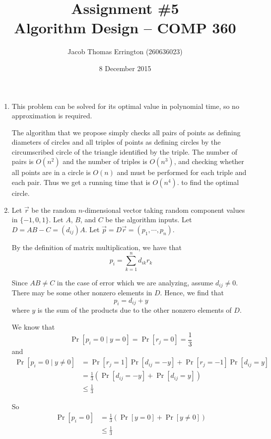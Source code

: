 \documentclass[letterpaper,11pt]{article}
\author{Jacob Thomas Errington (260636023)}
\title{Assignment \#5\\Algorithm Design -- COMP 360}
\date{8 December 2015}
\begin{document}
\begin{enumerate}
    \item
        This problem can be solved for its optimal value in polynomial time, so
        no approximation is required.

        The algorithm that we propose simply checks all pairs of points as
        defining diameters of circles and all triples of points as defining
        circles by the circumscribed circle of the triangle identified by the
        triple. The number of pairs is $O(n^2)$ and the number of triples is
        $O(n^3)$, and checking whether all points are in a circle is $O(n)$ and
        must be performed for each triple and each pair. Thus we get a running
        time that is $O(n^4)$. to find the optimal circle.

    \item
        Let $\vec r$ be the random $n$-dimensional vector taking random
        component values in $\{-1, 0, 1\}$. Let $A$, $B$, and $C$ be the
        algorithm inputs. Let $D = AB - C = (d_{ij})A$. Let
        $\vec p = D \vec r = (p_1, \cdots, p_n)$.

        By the definition of matrix multiplication, we have that
        $$p_i = \sum_{k=1}^n {d_{ik}r_k}$$

        Since $AB \neq C$ in the case of error which we are analyzing, assume
        $d_{ij} \neq 0$. There may be some other nonzero elements in $D$.
        Hence, we find that
        $$p_i = d_{ij} + y$$
        where $y$ is the sum of the products due to the other nonzero elements
        of $D$.

        We know that
        $$\Pr{[p_i = 0\mid y = 0] = \Pr{[r_j = 0]} = \frac{1}{3}}$$
        and
        \begin{align*}
            \Pr{[p_i = 0\mid y \neq 0]}
                &= \Pr{[r_j = 1]}\Pr{[d_{ij} = -y]}
                + \Pr{[r_j = -1]}\Pr{[d_{ij} = y]} \\
                &= \frac{1}{3}
                \left(\Pr{[d_{ij} = -y]} + \Pr{[d_{ij} = y]}\right) \\
                &\leq \frac{1}{3}
        \end{align*}

        So
        \begin{align*}
            \Pr{[p_i = 0]}
                &= \frac{1}{3}\left(\Pr{[y = 0]} + \Pr{[y \neq 0]}\right) \\
                &\leq \frac{1}{3}
        \end{align*}


\end{enumerate}
\end{document}
